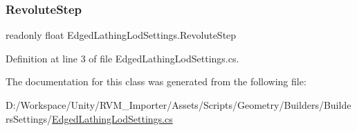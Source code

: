 \subsubsection{\texorpdfstring{RevoluteStep}{RevoluteStep}}
{\footnotesize\ttfamily readonly float Edged\+Lathing\+Lod\+Settings.\+Revolute\+Step}



Definition at line 3 of file Edged\+Lathing\+Lod\+Settings.\+cs.



The documentation for this class was generated from the following file\+:\begin{DoxyCompactItemize}
\item 
D\+:/\+Workspace/\+Unity/\+R\+V\+M\+\_\+\+Importer/\+Assets/\+Scripts/\+Geometry/\+Builders/\+Builders\+Settings/\mbox{\hyperlink{_edged_lathing_lod_settings_8cs}{Edged\+Lathing\+Lod\+Settings.\+cs}}\end{DoxyCompactItemize}
